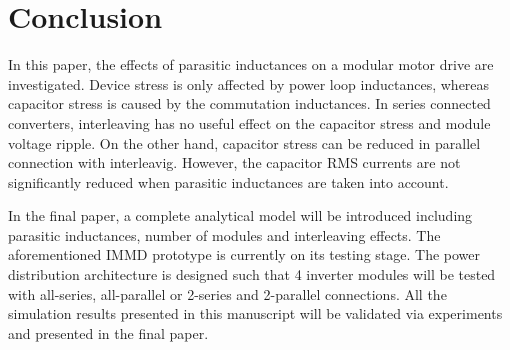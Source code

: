\section{Conclusion}

In this paper, the effects of parasitic inductances on a modular motor drive are investigated. Device stress is only affected by power loop inductances, whereas capacitor stress is caused by the commutation inductances. In series connected converters, interleaving has no useful effect on the capacitor stress and module voltage ripple. On the other hand, capacitor stress can be reduced in parallel connection with interleavig. However, the capacitor RMS currents are not significantly reduced when parasitic inductances are taken into account. 

In the final paper, a complete analytical model will be introduced including parasitic inductances, number of modules and interleaving effects. The aforementioned IMMD prototype is currently on its testing stage. The power distribution architecture is designed such that 4 inverter modules will be tested with all-series, all-parallel or 2-series and 2-parallel connections. All the simulation results presented in this manuscript will be validated via experiments and presented in the final paper.
